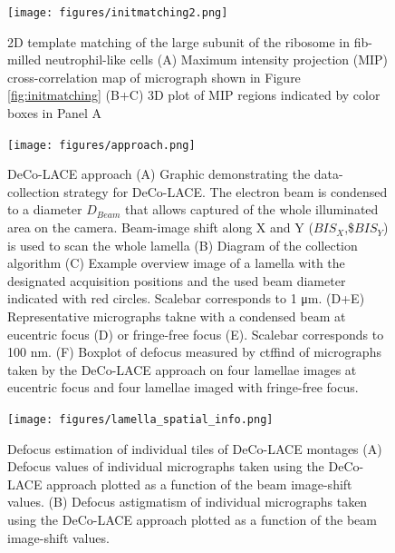 \documentclass[
]{article}
\newenvironment{fignos:tagged-figure}[1][]{
    \let\oldthefigure\thefigure
    \let\oldtheHfigure\theHfigure
    \renewcommand{\thefigure}{#1}
    \renewcommand{\theHfigure}{#1}
  }{
    \let\thefigure\oldthefigure
    \let\theHfigure\oldtheHfigure
    \addtocounter{figure}{-1}
  }
\begin{document}
\begin{fignos:tagged-figure}

\begin{figure}
\hypertarget{fig:initmatching2}{%
\centering
\texttt{[image: figures/initmatching2.png]}
\caption{2D template matching of the large subunit of the ribosome in
fib-milled neutrophil-like cells (A) Maximum intensity projection (MIP)
cross-correlation map of micrograph shown in Figure \ref{fig:initmatching}
(B+C) 3D plot of MIP regions indicated by color boxes in Panel
A}\label{fig:initmatching2}
}
\end{figure}

\end{fignos:tagged-figure}

\begin{figure}
\hypertarget{fig:approach}{%
\centering
\texttt{[image: figures/approach.png]}
\caption{DeCo-LACE approach (A) Graphic demonstrating the data-collection
strategy for DeCo-LACE. The electron beam is condensed to a diameter
\(D_{Beam}\) that allows captured of the whole illuminated area on the
camera. Beam-image shift along X and Y (\(BIS_X\),\$\(BIS_Y\)) is used to
scan the whole lamella (B) Diagram of the collection algorithm (C)
Example overview image of a lamella with the designated acquisition
positions and the used beam diameter indicated with red circles.
Scalebar corresponds to 1 μm. (D+E) Representative micrographs takne
with a condensed beam at eucentric focus (D) or fringe-free focus (E).
Scalebar corresponds to 100 nm. (F) Boxplot of defocus measured by
ctffind of micrographs taken by the DeCo-LACE approach on four lamellae
images at eucentric focus and four lamellae imaged with fringe-free
focus.}\label{fig:approach}
}
\end{figure}

\begin{fignos:tagged-figure}

\begin{figure}
\hypertarget{fig:lamella_spatial_info}{%
\centering
\texttt{[image: figures/lamella\_spatial\_info.png]}
\caption{Defocus estimation of individual tiles of DeCo-LACE montages (A)
Defocus values of individual micrographs taken using the DeCo-LACE
approach plotted as a function of the beam image-shift values. (B)
Defocus astigmatism of individual micrographs taken using the DeCo-LACE
approach plotted as a function of the beam image-shift
values.}\label{fig:lamella_spatial_info}
}
\end{figure}

\end{fignos:tagged-figure}
\end{document}
